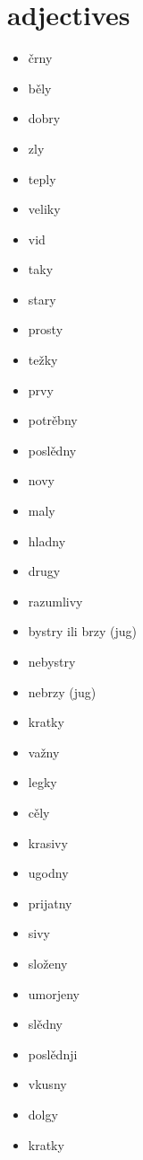\documentclass{article}
\begin{document}
\newpage
\section*{adjectives}

\begin{multicols}{2}
\begin{itemize}
  \item črny
  \item běly
  \item dobry
  \item zly
  \item teply
  \item veliky
  \item vid
  \item taky
  \item stary
  \item prosty
  \item težky
  \item prvy
  \item potrěbny
  \item poslědny
  \item novy
  \item maly
  \item hladny
  \item drugy
  \item razumlivy
  \item bystry ili brzy (jug)
  \item nebystry 
  \item nebrzy (jug)
  \item kratky
  \item važny
  \item legky
  \item cěly
  \item krasivy
  \item ugodny
  \item prijatny
  \item sivy
  \item složeny 
  \item umorjeny
  \item slědny
  \item poslědnji
  \item vkusny
  \item dolgy
  \item kratky
\end{itemize}
\end{multicols}

\small
\setlength{\tabcolsep}{2pt}
\renewcommand{\arraystretch}{1.1}
\end{document}
